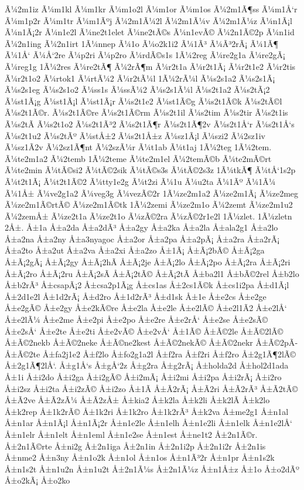 {Ã¼2m1iz
Ã¼m1kl
Ã¼m1kr
Ã¼m1o2l
Ã¼m1or
Ã¼m1os
Ã¼2m1Ã¶ss
Ã¼m1Å‘r
Ã¼m1p2r
Ã¼m1tr
Ã¼m1Ãºj
Ã¼2m1Ã¼2l
Ã¼2m1Ã¼v
Ã¼2m1Ã¼z
Ã¼n1Ã¡l
Ã¼n1Ã¡2r
Ã¼n1e2l
Ã¼ne2t1elet
Ã¼ne2tÃ©s
Ã¼n1evÃ©
Ã¼2n1Ã©2p
Ã¼n1id
Ã¼2n1ing
Ã¼2n1irt
1Ã¼nnep
Ã¼1o
Ã¼o2k1i2
Ã¼1Ã³
Ã¼Ã³2rÃ¡
Ã¼1Ã¶
Ã¼1Å‘
Ã¼Å‘2re
Ã¼p2ri
Ã¼p2ro
Ã¼rdÃ©s1s
1Ã¼2reg
Ã¼re2g1a
Ã¼re2gÃ¡
Ã¼reg1g
1Ã¼2res
Ã¼re2tÃ¶
Ã¼2rÃ¶m
Ã¼r2t1a
Ã¼r2t1Ã¡
Ã¼r2t1e2
Ã¼r2tis
Ã¼r2t1o2
Ã¼rtok1
Ã¼rtÃ¼2
Ã¼r2tÃ¼l
1Ã¼2rÃ¼l
Ã¼s2s1a2
Ã¼s2s1Ã¡
Ã¼s2s1eg
Ã¼s2s1o2
Ã¼ss1s
Ã¼ssÃ¼2
Ã¼s2s1Ã¼l
Ã¼s2t1a2
Ã¼s2tÃ¡2
Ã¼st1Ã¡g
Ã¼st1Ã¡l
Ã¼st1Ã¡r
Ã¼s2t1e2
Ã¼st1Ã©g
Ã¼s2t1Ã©k
Ã¼s2tÃ©l
Ã¼s2t1Ã©r.
Ã¼s2t1Ã©re
Ã¼s2t1Ã©rm
Ã¼s2t1il
Ã¼s2tim
Ã¼s2tir
Ã¼s2t1is
Ã¼s2tÃ­
Ã¼s2t1o2
Ã¼s2t1Ã³2
Ã¼s2t1Ã¶r
Ã¼s2t1Ã¶2v
Ã¼s2t1Å‘r
Ã¼s2t1Å‘s
Ã¼s2t1u2
Ã¼s2tÃº
Ã¼stÅ±2
Ã¼s2t1Å±z
Ã¼sz1Ã¡l
Ã¼szi2
Ã¼2sz1iv
Ã¼sz1Ã­2v
Ã¼2sz1Ã¶nt
Ã¼2szÃ¼r
Ã¼t1ab
Ã¼t1aj
1Ã¼2teg
1Ã¼2tem.
Ã¼te2m1a2
Ã¼2temb
1Ã¼2teme
Ã¼te2m1el
Ã¼2temÃ©b
Ã¼te2mÃ©rt
Ã¼te2min
Ã¼tÃ©si2
Ã¼tÃ©2sik
Ã¼tÃ©s3s
Ã¼tÃ©2s3z
1Ã¼tkÃ¶
Ã¼tÅ‘1s2p
Ã¼t2t1Ã¡
Ã¼t2t1Ã©2
Ã¼tty1e2g
Ã¼t2zi
Ã¼1u
Ã¼u2ta
Ã¼1Ãº
Ã¼1Ã¼
Ã¼1Å±
Ã¼ve2g1a2
Ã¼veg3g
Ã¼vezÃ©2r
1Ã¼ze2m1a2
Ã¼ze2m1Ã¡
Ã¼ze2meg
Ã¼ze2m1Ã©rtÃ©
Ã¼ze2m1Ã©tk
1Ã¼2zemi
Ã¼ze2m1o
Ã¼2zemt
Ã¼ze2m1u2
Ã¼2zemÅ±
Ã¼ze2t1a
Ã¼ze2t1o
Ã¼zÃ©2ra
Ã¼zÃ©2r1e2l
1Ã¼zlet.
1Ã¼zletn
2Å±.
Å±1a
Å±a2da
Å±a2dÃ³
Å±a2gy
Å±a2ka
Å±a2la
Å±ala2g1
Å±a2lo
Å±a2na
Å±a2ny
Å±a3nyagoc
Å±a2or
Å±a2pa
Å±a2pÃ¡
Å±a2ra
Å±a2rÃ¡
Å±a2to
Å±a2ut
Å±a2va
Å±a2xi
Å±a2zo
Å±1Ã¡
Å±Ã¡2bÃ©
Å±Ã¡2ga
Å±Ã¡2gÃ¡
Å±Ã¡2gy
Å±Ã¡2hÃ­
Å±Ã¡2je
Å±Ã¡2lo
Å±Ã¡2po
Å±Ã¡2ra
Å±Ã¡2ri
Å±Ã¡2ro
Å±Ã¡2ru
Å±Ã¡2sÃ­
Å±Ã¡2tÃ©
Å±Ã¡2tÃ­
Å±ba2l1
Å±bÃ©2rel
Å±b2lo
Å±b2rÃ³
Å±csapÃ¡2
Å±csa2p1Ã¡g
Å±cs1as
Å±2cs1Ã©k
Å±cs1i2pa
Å±d1Ã¡l
Å±2d1e2l
Å±1d2rÃ¡
Å±d2ro
Å±1d2rÃ³
Å±d1sk
Å±1e
Å±e2cs
Å±e2ge
Å±e2gÃ©
Å±e2gy
Å±e2kÃ©re
Å±e2la
Å±e2le
Å±e2lÃ©
Å±e2l1Ã­2
Å±e2lÅ‘
Å±e2lÃ¼
Å±e2me
Å±e2pi
Å±e2po
Å±e2re
Å±e2rÅ‘
Å±e2se
Å±e2sÃ©
Å±e2sÅ‘
Å±e2te
Å±e2ti
Å±e2vÃ©
Å±e2vÅ‘
Å±1Ã©
Å±Ã©2le
Å±Ã©2lÃ©
Å±Ã©2nekb
Å±Ã©2neke
Å±Ã©ne2kest
Å±Ã©2nekÃ©
Å±Ã©2nekr
Å±Ã©2pÃ­
Å±Ã©2te
Å±fa2j1e2
Å±f2lo
Å±fo2g1a2l
Å±f2ra
Å±f2ri
Å±f2ro
Å±2g1Ã¶2lÃ©
Å±2g1Ã¶2lÅ‘.
Å±g1Å‘s
Å±gÅ‘2z
Å±g2ra
Å±g2rÃ¡
Å±holda2d
Å±hol2d1ada
Å±1i
Å±i2do
Å±i2ga
Å±i2gÃ©
Å±i2mÃ¡
Å±i2mi
Å±i2pa
Å±i2rÃ¡
Å±i2ro
Å±i2sz
Å±i2ta
Å±i2zÃ©
Å±i2zo
Å±1Ã­
Å±Ã­2rÃ¡
Å±Ã­2ri
Å±Ã­2rÃ³
Å±Ã­2tÃ©
Å±Ã­2ve
Å±Ã­2zÃ¼
Å±Ã­2zÅ±
Å±kia2
Å±k2la
Å±k2li
Å±k2lÃ­
Å±k2lo
Å±k2rep
Å±1k2rÃ©
Å±1k2ri
Å±1k2ro
Å±1k2rÃ³
Å±k2va
Å±me2g1
Å±n1al
Å±n1ar
Å±n1Ã¡l
Å±n1Ã¡2r
Å±n1e2le
Å±n1elh
Å±n1e2li
Å±n1elk
Å±n1e2lÅ‘
Å±n1elr
Å±n1elt
Å±n1eml
Å±n1e2se
Å±n1est
Å±ne1t2
Å±2n1Ã©r.
Å±2n1Ã©rte
Å±ni2g
Å±2n1iga
Å±2n1in
Å±2n1i2p
Å±2n1i2r
Å±2n1is
Å±nme2
Å±n3ny
Å±n1o2k
Å±n1ol
Å±n1os
Å±n1Ã³2r
Å±n1pr
Å±n1s2k
Å±n1s2t
Å±n1u2n
Å±n1u2t
Å±2n1Ã¼s
Å±2n1Ã¼z
Å±n1Å±z
Å±1o
Å±o2dÃº
Å±o2kÃ¡
Å±o2ko
}
